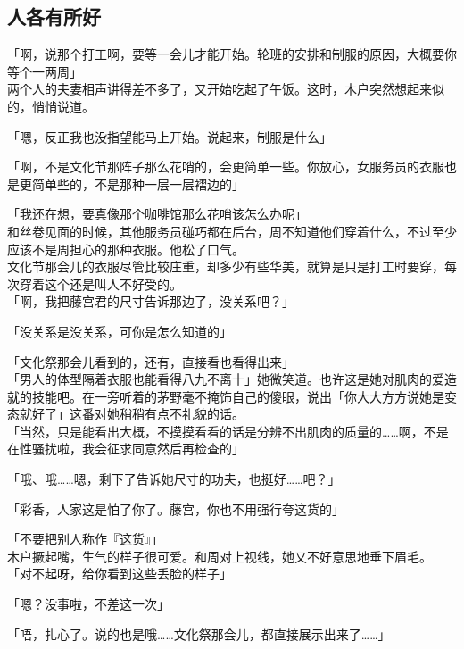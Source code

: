 \subsection{人各有所好}

「啊，说那个打工啊，要等一会儿才能开始。轮班的安排和制服的原因，大概要你等个一两周」\\

两个人的夫妻相声讲得差不多了，又开始吃起了午饭。这时，木户突然想起来似的，悄悄说道。

「嗯，反正我也没指望能马上开始。说起来，制服是什么」

「啊，不是文化节那阵子那么花哨的，会更简单一些。你放心，女服务员的衣服也是更简单些的，不是那种一层一层褶边的」

「我还在想，要真像那个咖啡馆那么花哨该怎么办呢」\\

和丝卷见面的时候，其他服务员碰巧都在后台，周不知道他们穿着什么，不过至少应该不是周担心的那种衣服。他松了口气。\\

文化节那会儿的衣服尽管比较庄重，却多少有些华美，就算是只是打工时要穿，每次穿着这个还是叫人不好受的。\\

「啊，我把藤宫君的尺寸告诉那边了，没关系吧？」

「没关系是没关系，可你是怎么知道的」

「文化祭那会儿看到的，还有，直接看也看得出来」\\

「男人的体型隔着衣服也能看得八九不离十」她微笑道。也许这是她对肌肉的爱造就的技能吧。在一旁听着的茅野毫不掩饰自己的傻眼，说出「你大大方方说她是变态就好了」这番对她稍稍有点不礼貌的话。\\

「当然，只是能看出大概，不摸摸看看的话是分辨不出肌肉的质量的……啊，不是在性骚扰啦，我会征求同意然后再检查的」

「哦、哦……嗯，剩下了告诉她尺寸的功夫，也挺好……吧？」

「彩香，人家这是怕了你了。藤宫，你也不用强行夸这货的」

「不要把别人称作『这货』」\\

木户撅起嘴，生气的样子很可爱。和周对上视线，她又不好意思地垂下眉毛。\\

「对不起呀，给你看到这些丢脸的样子」

「嗯？没事啦，不差这一次」

「唔，扎心了。说的也是哦……文化祭那会儿，都直接展示出来了……」

